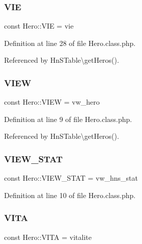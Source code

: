 \subsubsection{\texorpdfstring{V\+IE}{VIE}}
{\footnotesize\ttfamily const Hero\+::\+V\+IE = \textquotesingle{}vie\textquotesingle{}}



Definition at line 28 of file Hero.\+class.\+php.



Referenced by Hn\+S\+Table\textbackslash{}get\+Heros().

\mbox{\label{class_hero_ad2cf847e53c8fe77bafcd0402a56335b}} 
\subsubsection{\texorpdfstring{V\+I\+EW}{VIEW}}
{\footnotesize\ttfamily const Hero\+::\+V\+I\+EW = \textquotesingle{}vw\+\_\+hero\textquotesingle{}}



Definition at line 9 of file Hero.\+class.\+php.



Referenced by Hn\+S\+Table\textbackslash{}get\+Heros().

\mbox{\label{class_hero_a89472a268f641ef6610db1c90fb239af}} 
\subsubsection{\texorpdfstring{V\+I\+E\+W\+\_\+\+S\+T\+AT}{VIEW\_STAT}}
{\footnotesize\ttfamily const Hero\+::\+V\+I\+E\+W\+\_\+\+S\+T\+AT = \textquotesingle{}vw\+\_\+hns\+\_\+stat\textquotesingle{}}



Definition at line 10 of file Hero.\+class.\+php.

\mbox{\label{class_hero_ade7f612b26ba8dd1df6b335abbece9de}} 
\subsubsection{\texorpdfstring{V\+I\+TA}{VITA}}
{\footnotesize\ttfamily const Hero\+::\+V\+I\+TA = \textquotesingle{}vitalite\textquotesingle{}}



